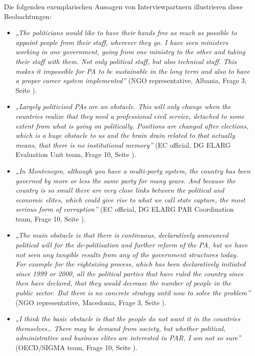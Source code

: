 Die folgenden exemplarischen Aussagen von Interviewpartnern illustrieren diese Beobachtungen:
\begin{itemize}[label={}]
\item \textit{„The politicians would like to have their hands free as much as possible to appoint people from their staff, wherever they go. I have seen ministers working in one government, going from one ministry to the other and taking their staff with them. Not only political staff, but also technical staff. This makes it impossible for PA to be sustainable in the long term and also to have a proper career system implemented”} (NGO representative, Albania, Frage 3, Seite \pageref{sec:par montenegro}).
\item \textit{„Largely politicised PAs are an obstacle. This will only change when the countries realize that they need a professional civil service, detached to some extent from what is going on politically. Positions are changed after elections, which is a huge obstacle to us and the brain drain related to that actually means, that there is no institutional memory”} (EC official, DG ELARG Evaluation Unit team, Frage 10, Seite \pageref{sec:montenegro2}).
\item \textit{„In Montenegro, although you have a multi-party system, the country has been governed by more or less the same party for many years. And because the country is so small there are very close links between the political and economic elites, which could give rise to what we call state capture, the most serious form of corruption”} (EC official, DG ELARG PAR Coordination team, Frage 10, Seite \pageref{sec:montenegro2}).
\item \textit{„The main obstacle is that there is continuous, declaratively announced political will for the de-politisation and further reform of the PA, but we have not seen any tangible results from any of the government structures today. For example for the rightsizing process, which has been declaratively initiated since 1999 or 2000, all the political parties that have ruled the country since then have declared, that they would decrease the number of people in the public sector. But there is no concrete strategy until now to solve the problem”} (NGO representative, Macedonia, Frage 3, Seite \pageref{sec:par montenegro}).
\item \textit{„I think the basic obstacle is that the people do not want it in the countries themselves… There may be demand from society, but whether political, administrative and business elites are interested in PAR, I am not so sure”} (OECD/SIGMA team, Frage 10, Seite \pageref{sec:montenegro2}).
\end{itemize}
